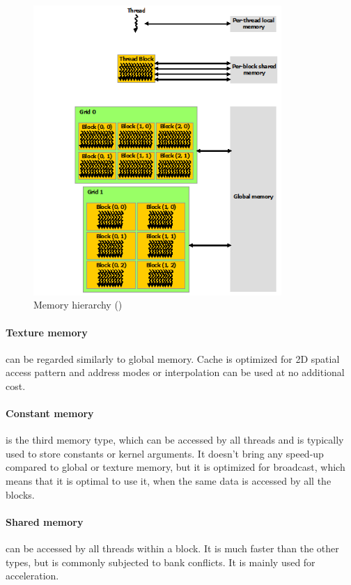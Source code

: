 \begin{center}
\begin{figure}[ht]
	\centering\includegraphics[height=11cm]{fig/memory-hierarchy.png}
	\caption{Memory hierarchy (\cite{cuda-toolkit-docs})}
\end{figure}
\end{center}

\FloatBarrier

\paragraph{Texture memory} can be regarded similarly to global memory. Cache is optimized for 2D spatial access pattern and address modes or interpolation can be used at no additional cost.

\paragraph{Constant memory} is the third memory type, which can be accessed by all threads and is typically used to store constants or kernel arguments. It doesn't bring any speed-up compared to global or texture memory, but it is optimized for broadcast, which means that it is optimal to use it, when the same data is accessed by all the blocks.

\paragraph{Shared memory} can be accessed by all threads within a block. It is much faster than the other types, but is commonly subjected to bank conflicts. It is mainly used for acceleration.

